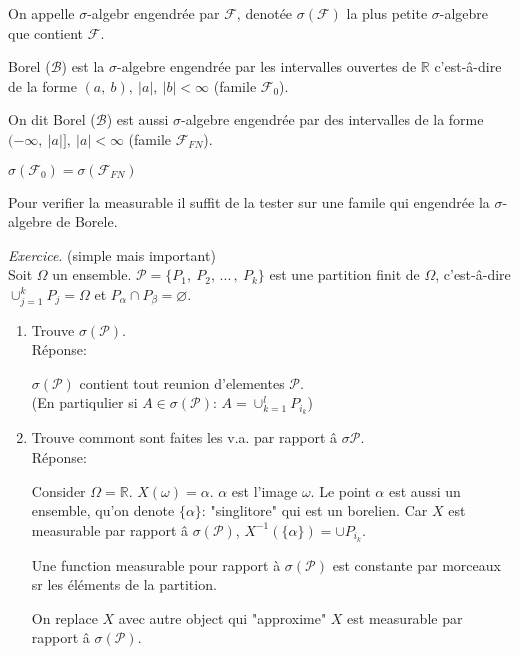 \begin{definition}
	On appelle $\sigma$-algebr engendrée par $\mathcal{F}$, denotée $\sigma(\mathcal{F})$ la plus petite $\sigma$-algebre que contient $\mathcal{F}$.
\end{definition}

\begin{definition}
	Borel ($\mathcal{B}$) est la $\sigma$-algebre engendrée par les intervalles ouvertes de $\mathbb{R}$ c'est-â-dire de la forme $(a,\ b),\ |a|,\ |b| < \infty$ (famile $\mathcal{F}_0$).
\end{definition}

On dit Borel ($\mathcal{B}$) est aussi $\sigma$-algebre engendrée par des intervalles de la forme $(-\infty,\ |a|],\ |a|<\infty$ (famile $\mathcal{F}_{FN}$).

\begin{remark}
	$\sigma(\mathcal{F}_0)=\sigma(\mathcal{F}_{FN})$
\end{remark}

\begin{proposition}
	Pour verifier la measurable il suffit de la tester sur une famile qui engendrée la $\sigma$-algebre de Borele.
\end{proposition}

\emph{Exercice}. (simple mais important)\\
Soit $\Omega$ un ensemble. $\mathcal{P}= \{P_1,\ P_2,\,...\,,\ P_k\}$ est une partition finit de $\Omega$, c'est-â-dire $\cup_{j=1}^k P_j=\Omega$ et $P_\alpha\cap P_\beta=\varnothing$.

\begin{enumerate}
	\item Trouve $\sigma(\mathcal{P})$.\\Réponse:
	
$\sigma(\mathcal{P})$ contient tout reunion d'elementes $\mathcal{P}$.\\
(En partiqulier si $A\in\sigma(\mathcal{P})$: $A=\cup_{k=1}^l P_{i_k}$)
	\item Trouve commont sont faites les v.a. par rapport â $\sigma{\mathcal{P}}$.\\Réponse:
	
	Consider $\Omega=\mathbb{R}$. $X(\omega)=\alpha$. $\alpha$ est l'image $\omega$. Le point  $\alpha$ est aussi un ensemble, qu'on denote $\{\alpha\}$: "singlitore" qui est un borelien. Car $X$ est measurable par rapport â $\sigma(\mathcal{P})$, $X^{-1}(\{\alpha\})=\cup P_{i_k}$.
	
	Une function measurable pour rapport à $\sigma(\mathcal{P})$ est constante par morceaux sr les éléments de la partition. 
	
	On replace $X$ avec autre object qui "approxime" $X$ est measurable par rapport â $\sigma(\mathcal{P})$.
\end{enumerate}

